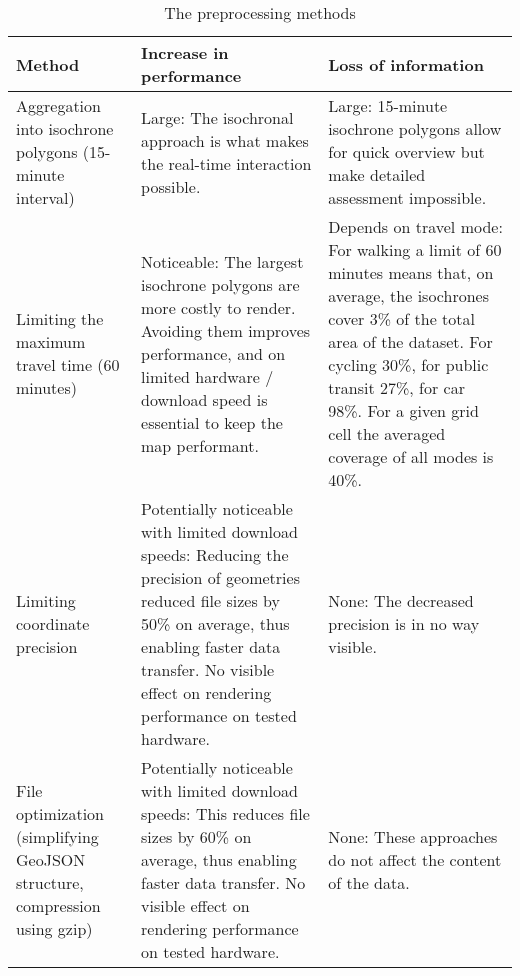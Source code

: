 \begin{table}[H]
	\caption{The preprocessing methods}
	\label{tab:preprocessing methods}
	\centering
	\begin{tabular}{ | L{0.21\textwidth} | L{0.35\textwidth} | L{0.35\textwidth} | }
		\hline
		\textbf{Method}
		& \textbf{Increase in performance}
		& \textbf{Loss of information}
		\\
		\hline
		\hline
		Aggregation into isochrone polygons (15-minute interval)
		& Large: The isochronal approach is what makes the real-time interaction possible.
		& Large: 15-minute isochrone polygons allow for quick overview but make detailed assessment impossible.
		\\
		\hline
		Limiting the maximum travel time (60 minutes)
		& Noticeable: The largest isochrone polygons are more costly to render.
		Avoiding them improves performance, and on limited hardware / download speed
		is essential to keep the map performant.
		& Depends on travel mode:
		For walking a limit of 60 minutes means that, on average,
		the isochrones cover 3\% of the total area of the dataset.
		For cycling 30\%, for public transit 27\%, for car 98\%.
		For a given grid cell the averaged coverage of all modes is 40\%.
		\\
		\hline
		Limiting coordinate precision
		& Potentially noticeable with limited download speeds:
		Reducing the precision of geometries reduced file sizes by 50\% on average,
		thus enabling faster data transfer.
		No visible effect on rendering performance on tested hardware.
		& None: The decreased precision is in no way visible.
		\\
		\hline
		File optimization (simplifying GeoJSON structure, compression using gzip)
		& Potentially noticeable with limited download speeds:
		This reduces file sizes by 60\% on average,  %
		thus enabling faster data transfer.
		No visible effect on rendering performance on tested hardware.
		& None: These approaches do not affect the content of the data.
		\\
		\hline
	\end{tabular}
\end{table}
